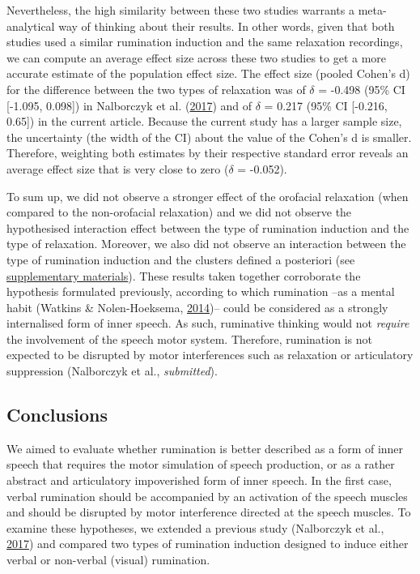 \documentclass[a4paper,12pt,twoside,openright,oldfontcommands,final]{memoir}
\begin{document}
Nevertheless, the high similarity between these two studies warrants a meta-analytical way of thinking about their results. In other words, given that both studies used a similar rumination induction and the same relaxation recordings, we can compute an average effect size across these two studies to get a more accurate estimate of the population effect size. The effect size (pooled Cohen's d) for the difference between the two types of relaxation was of \(\delta\) = -0.498 (95\% CI {[}-1.095, 0.098{]}) in Nalborczyk et al. (\protect\hyperlink{ref-nalborczyk_orofacial_2017}{2017}) and of \(\delta\) = 0.217 (95\% CI {[}-0.216, 0.65{]}) in the current article. Because the current study has a larger sample size, the uncertainty (the width of the CI) about the value of the Cohen's d is smaller. Therefore, weighting both estimates by their respective standard error reveals an average effect size that is very close to zero (\(\delta\) = -0.052).

To sum up, we did not observe a stronger effect of the orofacial relaxation (when compared to the non-orofacial relaxation) and we did not observe the hypothesised interaction effect between the type of rumination induction and the type of relaxation. Moreover, we also did not observe an interaction between the type of rumination induction and the clusters defined a posteriori (see \protect\hyperlink{suppCh4}{supplementary materials}). These results taken together corroborate the hypothesis formulated previously, according to which rumination --as a mental habit (Watkins \& Nolen-Hoeksema, \protect\hyperlink{ref-watkins_habit-goal_2014}{2014})-- could be considered as a strongly internalised form of inner speech. As such, ruminative thinking would not \emph{require} the involvement of the speech motor system. Therefore, rumination is not expected to be disrupted by motor interferences such as relaxation or articulatory suppression (Nalborczyk et al., \emph{submitted}).

\hypertarget{conclusions}{%
\subsection{Conclusions}\label{conclusions}}

We aimed to evaluate whether rumination is better described as a form of inner speech that requires the motor simulation of speech production, or as a rather abstract and articulatory impoverished form of inner speech. In the first case, verbal rumination should be accompanied by an activation of the speech muscles and should be disrupted by motor interference directed at the speech muscles. To examine these hypotheses, we extended a previous study (Nalborczyk et al., \protect\hyperlink{ref-nalborczyk_orofacial_2017}{2017}) and compared two types of rumination induction designed to induce either verbal or non-verbal (visual) rumination.
\end{document}
